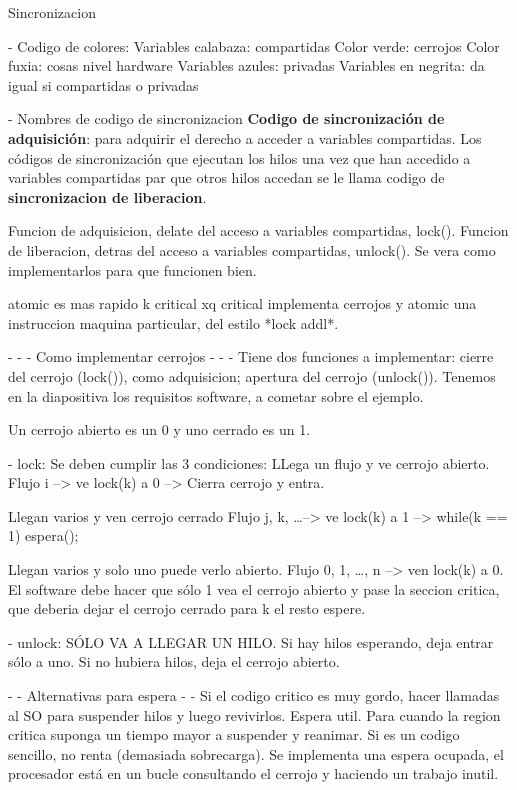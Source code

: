 Sincronizacion

- Codigo de colores:
Variables calabaza: compartidas
Color verde: cerrojos
Color fuxia: cosas nivel hardware
Variables azules: privadas
Variables en negrita: da igual si compartidas o privadas

- Nombres de codigo de sincronizacion
\textbf{Codigo de sincronización de adquisición}: para adquirir el derecho a acceder a variables compartidas.
Los códigos de sincronización que ejecutan los hilos una vez que han accedido a variables compartidas par que otros hilos accedan se le llama codigo de \textbf{sincronizacion de liberacion}.

Funcion de adquisicion, delate del acceso a variables compartidas, lock().
Funcion de liberacion, detras del acceso a variables compartidas, unlock().
Se vera como implementarlos para que funcionen bien.




atomic es mas rapido k critical xq critical implementa cerrojos y atomic una instruccion maquina particular, del estilo *lock addl*.

- - - Como implementar cerrojos - - -
Tiene dos funciones a implementar: cierre del cerrojo (lock()), como adquisicion; apertura del cerrojo (unlock()).
Tenemos en la diapositiva los requisitos software, a cometar sobre el ejemplo.

Un cerrojo abierto es un 0 y uno cerrado es un 1.

- lock: Se deben cumplir las 3 condiciones:
LLega un flujo y ve cerrojo abierto.
Flujo i --> ve lock(k) a 0 --> Cierra cerrojo y entra.

Llegan varios y ven cerrojo cerrado
Flujo j, k, \ldots --> ve lock(k) a 1 --> while(k == 1) espera(); 

Llegan varios y solo uno puede verlo abierto.
Flujo 0, 1, \ldots, n --> ven lock(k) a 0. 
El software debe hacer que sólo 1 vea el cerrojo abierto y pase la seccion critica, que deberia dejar el cerrojo cerrado para k el resto espere.

- unlock: SÓLO VA A LLEGAR UN HILO.
Si hay hilos esperando, deja entrar sólo a uno.
Si no hubiera hilos, deja el cerrojo abierto.

- - Alternativas para espera - -
Si el codigo critico es muy gordo, hacer llamadas al SO para suspender hilos y luego revivirlos. Espera util. Para cuando la region critica suponga un tiempo mayor a suspender y reanimar.
Si es un codigo sencillo, no renta (demasiada sobrecarga). Se implementa una espera ocupada, el procesador está en un bucle consultando el cerrojo y haciendo un trabajo inutil.


